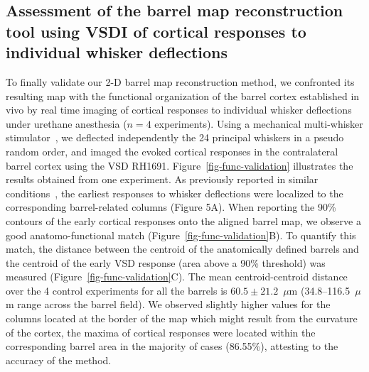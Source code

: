 \subsection{Assessment of the barrel map reconstruction tool using VSDI of cortical responses to individual whisker deflections}

To finally validate our 2-D barrel map reconstruction method, we confronted its resulting map with the functional organization of the barrel cortex established in vivo by real time imaging of cortical responses to individual whisker deflections under urethane anesthesia ($n=4$ experiments). Using a mechanical multi-whisker stimulator~\cite{Jacob10}, we deflected independently the 24 principal whiskers in a pseudo random order, and imaged the evoked cortical responses in the contralateral barrel cortex using the VSD RH1691. 
Figure~\ref{fig-func-validation} illustrates the results obtained from one experiment.
As previously reported in similar conditions~\cite{ferezou_2006}, the earliest responses to whisker deflections were localized to the corresponding barrel-related columns (Figure 5A). 
%
When reporting the 90\% contours of the early cortical responses onto the aligned barrel map, we observe a good anatomo-functional match (Figure~\ref{fig-func-validation}B).
%
To quantify this match, the distance between the centroid of the anatomically defined barrels and the centroid of the early VSD response (area above a 90\% threshold) was measured (Figure~\ref{fig-func-validation}C). The mean centroid-centroid distance over the 4 control experiments for all the barrels is $60.5\pm21.2$~$\mu$m (34.8--116.5~$\mu$m range across the barrel field). We observed slightly higher values for the columns located at the border of the map which might result from the curvature of the cortex, the  maxima of cortical responses were located within the corresponding barrel area in the majority of cases (86.55\%), attesting to the accuracy of the method.




